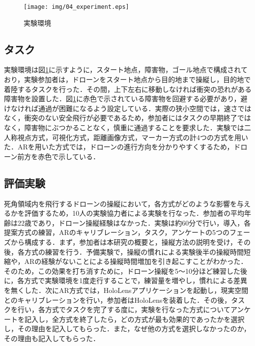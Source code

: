 \documentclass[submit]{ipsj}
\begin{document}
\begin{figure}[tb]
  \centering
  \texttt{[image: img/04\_experiment.eps]}
  \caption{実験環境}
  \label{fig:04_experiment}
\end{figure}

\subsection{タスク}
実験環境は図\ref{fig:04_experiment}に示すように，スタート地点，障害物，ゴール地点で構成されており，実験参加者は，ドローンをスタート地点から目的地まで操縦し，目的地で着陸するタスクを行った．その間，上下左右に移動しなければ衝突の恐れがある障害物を設置した．図\ref{fig:04_experiment}に赤色で示されている障害物を回避する必要があり，避けなければ通過が困難になるよう設定している．実際の狭小空間では，速さではなく，衝突のない安全飛行が必要であるため，参加者にはタスクの早期終了ではなく，障害物にぶつかることなく，慎重に通過することを要求した．実験では二人称視点方式，可視化方式，距離画像方式，マーカー方式の計4つの方式を用いた．ARを用いた方式では，ドローンの進行方向を分かりやすくするため，ドローン前方を赤色で示している．


\subsection{評価実験}
死角領域内を飛行するドローンの操縦において，各方式がどのような影響を与えるかを評価するため，10人の実験協力者による実験を行なった．参加者の平均年齢は22歳であり，ドローン操縦経験はなかった．実験は約60分で行い，導入，各提案方式の練習，ARのキャリブレーション，タスク，アンケートの5つのフェーズから構成する．まず，参加者は本研究の概要と，操縦方法の説明を受け，その後，各方式の練習を行う．予備実験で，操縦の慣れによる実験後半の操縦時間短縮や，ARの経験がないことによる操縦時間増加を引き起こすことがわかった．そのため，この効果を打ち消すために，ドローン操縦を5〜10分ほど練習した後に，各方式で実験環境を1度走行することで，練習量を増やし，慣れによる差異を無くした．次にAR方式では，HoloLensアプリケーションを起動し，現実空間とのキャリブレーションを行い，参加者はHoloLensを装着した．その後，タスクを行い，各方式でタスクを完了する度に，実験を行なった方式についてアンケートを記入し，全方式を終了したら，どの方式が最も効果的であったかを選択し，その理由を記入してもらった．また，なぜ他の方式を選択しなかったのか，その理由も記入してもらった．
\end{document}
